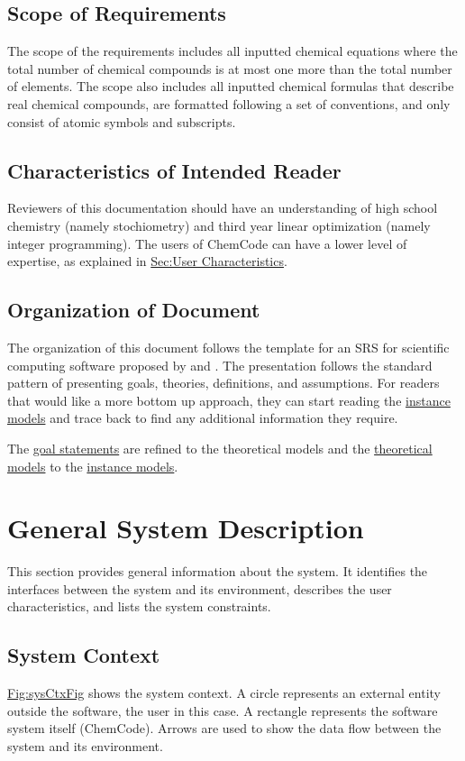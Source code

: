 \documentclass[12pt]{article}
\begin{document}
\subsection{Scope of Requirements}
\label{Sec:ReqsScope}
The scope of the requirements includes all inputted chemical equations where the total number of chemical compounds is at most one more than the total number of elements. The scope also includes all inputted chemical formulas that describe real chemical compounds, are formatted following a set of conventions, and only consist of atomic symbols and subscripts.

\subsection{Characteristics of Intended Reader}
\label{Sec:ReaderChars}
Reviewers of this documentation should have an understanding of high school chemistry (namely stochiometry) and third year linear optimization (namely integer programming). The users of ChemCode can have a lower level of expertise, as explained in \hyperref[Sec:UserChars]{Sec:User Characteristics}.

\subsection{Organization of Document}
\label{Sec:DocOrg}
The organization of this document follows the template for an SRS for scientific computing software proposed by \cite{koothoor2013} and \cite{smithLai2005}. The presentation follows the standard pattern of presenting goals, theories, definitions, and assumptions. For readers that would like a more bottom up approach, they can start reading the \hyperref[Sec:IMs]{instance models} and trace back to find any additional information they require.

The \hyperref[Sec:GoalStmt]{goal statements} are refined to the theoretical models and the \hyperref[Sec:TMs]{theoretical models} to the \hyperref[Sec:IMs]{instance models}.

\section{General System Description}
\label{Sec:GenSysDesc}
This section provides general information about the system. It identifies the interfaces between the system and its environment, describes the user characteristics, and lists the system constraints.

\subsection{System Context}
\label{Sec:SysContext}
\hyperref[Figure:sysCtxFig]{Fig:sysCtxFig} shows the system context. A circle represents an external entity outside the software, the user in this case. A rectangle represents the software system itself (ChemCode). Arrows are used to show the data flow between the system and its environment.
\end{document}

